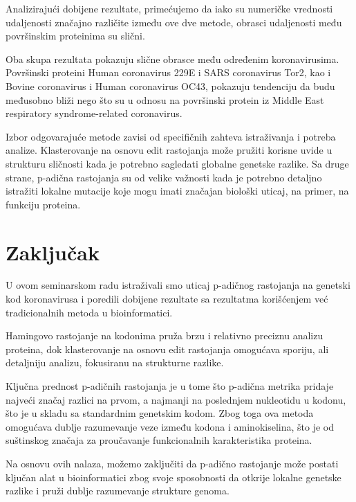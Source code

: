 \documentclass[a4paper,12pt]{article}
\begin{document}
\newpage
Analizirajući dobijene rezultate, primećujemo da iako su numeričke vrednosti udaljenosti značajno različite između ove dve metode, obrasci udaljenosti među površinskim proteinima su slični. 

\bigskip
Oba skupa rezultata pokazuju slične obrasce među određenim koronavirusima. Površinski proteini Human coronavirus 229E i SARS coronavirus Tor2, kao i Bovine coronavirus i Human coronavirus OC43, pokazuju tendenciju da budu međusobno bliži nego što su u odnosu na površinski protein iz Middle East respiratory syndrome-related coronavirus.

\bigskip
Izbor odgovarajuće metode zavisi od specifičnih zahteva istraživanja i potreba analize. Klasterovanje na osnovu edit rastojanja može pružiti korisne uvide u strukturu sličnosti kada je potrebno sagledati globalne genetske razlike. Sa druge strane, p-adična rastojanja su od velike važnosti kada je potrebno detaljno istražiti lokalne mutacije koje mogu imati značajan biološki uticaj, na primer, na funkciju proteina.



\newpage
\section{Zaključak}
U ovom seminarskom radu istraživali smo uticaj p-adičnog rastojanja na genetski kod koronavirusa i poredili dobijene rezultate sa rezultatma korišćenjem već tradicionalnih metoda u bioinformatici.

\bigskip
Hamingovo rastojanje na kodonima pruža brzu i relativno preciznu analizu proteina, dok klasterovanje na osnovu edit rastojanja omogućava sporiju, ali detaljniju analizu, fokusiranu na strukturne razlike.

\bigskip
Ključna prednost p-adičnih rastojanja je u tome što p-adična metrika pridaje najveći značaj razlici na prvom, a najmanji na poslednjem nukleotidu u kodonu, što je u skladu sa standardnim genetskim kodom. Zbog toga ova metoda omogućava dublje razumevanje veze između kodona i aminokiselina, što je od suštinskog značaja za proučavanje funkcionalnih karakteristika proteina. 


\bigskip
Na osnovu ovih nalaza, možemo zaključiti da p-adično rastojanje može postati ključan alat u bioinformatici zbog svoje sposobnosti da otkrije lokalne genetske razlike i pruži dublje razumevanje strukture genoma.
\end{document}
